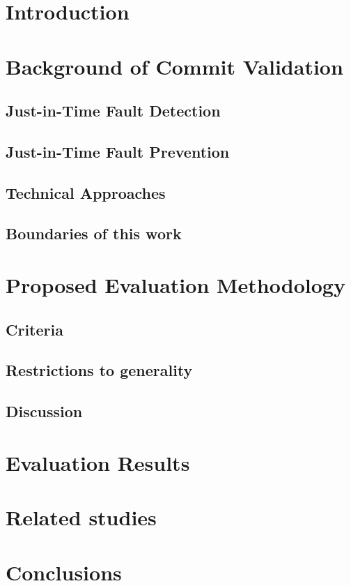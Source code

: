 \section{Introduction}
\section{Background of Commit Validation}
\subsection{Just-in-Time Fault Detection}
\subsection{Just-in-Time Fault Prevention}
\subsection{Technical Approaches}
\cite{Goyal2017,Rosen2015,Nayrolles2018,Kamei2013,Yang2015}
\subsection{Boundaries of this work}
\section{Proposed Evaluation Methodology}
\subsection{Criteria}
\subsection{Restrictions to generality}
\subsection{Discussion}
\section{Evaluation Results}
\section{Related studies}
\cite{Kim2008,Catolino2019,Syed2019,Yang2016}
\section{Conclusions}